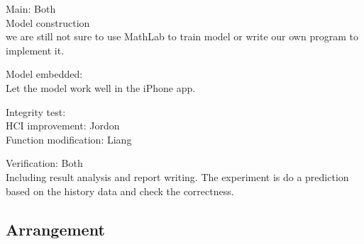 \documentclass[12pt]{article}
\begin{document}
Main: Both\\
    Model construction \\  
    we are still not sure to use MathLab to train model or write our
    own program to implement it.

    Model embedded: \\
    Let the model work well in the iPhone app.

Integrity test: \\
    HCI improvement: Jordon \\ 
    Function modification:  Liang 

Verification: Both\\
    Including result analysis and report writing. The experiment is do
    a prediction based on the history data and check the correctness.

\subsection{Arrangement}
  \begin{gantt}{7}{8}
    \begin{ganttitle}
    \end{ganttitle}
  \end{gantt}



\end{document}
